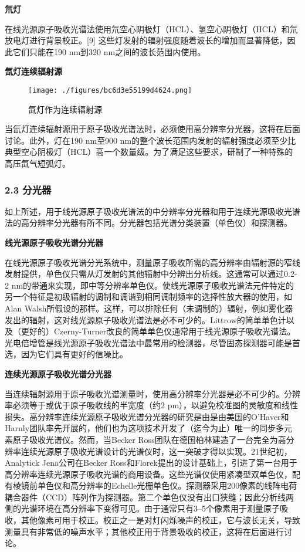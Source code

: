 \textbf{氘灯}

在线光源原子吸收光谱法使用氘空心阴极灯（HCL）、氢空心阴极灯（HCL）和氘放电灯进行背景校正。[9] 这些灯发射的辐射强度随着波长的增加而显著降低，因此它们只能在190 nm到320 nm之间的波长范围内使用。

\textbf{氙灯连续辐射源}

\begin{figure}[ht]
\centering
\texttt{[image: ./figures/bc6d3e55199d4624.png]}
\caption{氙灯作为连续辐射源} \label{fig_AAS_7}
\end{figure}

当氙灯连续辐射源用于原子吸收光谱法时，必须使用高分辨率分光器，这将在后面讨论。此外，灯在190 nm至900 nm的整个波长范围内发射的辐射强度必须至少比典型空心阴极灯（HCL）高一个数量级。为了满足这些要求，研制了一种特殊的高压氙气短弧灯。

\subsubsection{2.3 分光器}

如上所述，用于线光源原子吸收光谱法的中分辨率分光器和用于连续光源吸收光谱法的高分辨率分光器有所不同。分光器包括光谱分类装置（单色仪）和探测器。

\textbf{线光源原子吸收光谱分光器}

在线光源原子吸收光谱分光系统中，测量原子吸收所需的高分辨率由辐射源的窄线发射提供，单色仪只需从灯发射的其他辐射中分辨出分析线。这通常可以通过0.2-2 nm的带通来实现，即中等分辨率单色仪。使线光源原子吸收光谱法元件特定的另一个特征是初级辐射的调制和调谐到相同调制频率的选择性放大器的使用，如Alan Walsh所假设的那样。这样，可以排除任何（未调制的）辐射，例如雾化器发出的辐射，这对线光源原子吸收光谱法是必不可少的。Littrow的简单单色计以及（更好的）Czerny-Turner改良的简单单色仪通常用于线光源原子吸收光谱法。光电倍增管是线光源原子吸收光谱法中最常用的检测器，尽管固态探测器可能是首选，因为它们具有更好的信噪比。

\textbf{连续光源原子吸收光谱分光器}

当连续辐射源用于原子吸收光谱测量时，使用高分辨率分光器是必不可少的。分辨率必须等于或优于原子吸收线的半宽度（约2 pm），以避免校准图的灵敏度和线性损失。高分辨率连续光源原子吸收光谱分光器的研究是由是由美国的O'Haver和Harnly团队率先开展的，他们也为这项技术开发了（迄今为止）唯一的同步多元素原子吸收光谱仪。然而，当Becker Ross团队在德国柏林建造了一台完全为高分辨率连续光源原子吸收光谱设计的光谱仪时，这一突破才得以实现。21世纪初，Analytick Jena公司在Becker Ross和Florek提出的设计基础上，引进了第一台用于高分辨率连续光源原子吸收光谱的商用设备。这些光谱仪使用紧凑型双单色仪，配有棱镜前单色仪和高分辨率的Echelle光栅单色仪。探测器采用200像素的线阵电荷耦合器件（CCD）阵列作为探测器。第二个单色仪没有出口狭缝；因此分析线两侧的光谱环境在高分辨率下变得可见。由于通常只有3–5个像素用于测量原子吸收，其他像素可用于校正。校正之一是对灯闪烁噪声的校正，它与波长无关，导致测量具有非常低的噪声水平；其他校正用于背景吸收的校正，这将在后面进行讨论。

